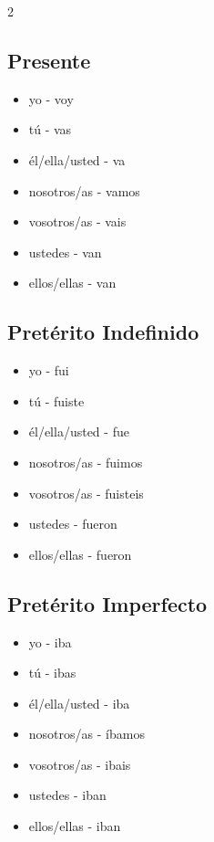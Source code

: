 \documentclass[12pt,a4paper]{article}
\begin{document}
\begin{multicols}{2}

\subsection*{Presente}
\begin{itemize}[leftmargin=*]
    \item yo - voy
    \item tú - vas
    \item él/ella/usted - va
    \item nosotros/as - vamos
    \item vosotros/as - vais
    \item ustedes - van
    \item ellos/ellas - van
\end{itemize}

\subsection*{Pretérito Indefinido}
\begin{itemize}[leftmargin=*]
    \item yo - fui
    \item tú - fuiste
    \item él/ella/usted - fue
    \item nosotros/as - fuimos
    \item vosotros/as - fuisteis
    \item ustedes - fueron
    \item ellos/ellas - fueron
\end{itemize}

\subsection*{Pretérito Imperfecto}
\begin{itemize}[leftmargin=*]
    \item yo - iba
    \item tú - ibas
    \item él/ella/usted - iba
    \item nosotros/as - íbamos
    \item vosotros/as - ibais
    \item ustedes - iban
    \item ellos/ellas - iban
\end{itemize}

\columnbreak


\end{multicols}
\end{document}
